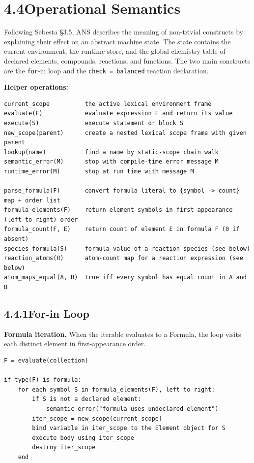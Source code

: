 \documentclass[11pt,a4paper]{article}
\newcommand{\code}[1]{\texttt{#1}}
\begin{document}
\newpage
\section{4.4\quad Operational Semantics}

Following Sebesta \S3.5, ANS describes the meaning of non-trivial constructs by explaining their effect on an abstract machine state. The state contains the current environment, the runtime store, and the global chemistry table of declared elements, compounds, reactions, and functions. The two main constructs are the \code{for}-in loop and the \code{check = balanced} reaction declaration.

\textbf{Helper operations:}
\begin{lstlisting}[style=sem]
current_scope          the active lexical environment frame
evaluate(E)            evaluate expression E and return its value
execute(S)             execute statement or block S
new_scope(parent)      create a nested lexical scope frame with given parent
lookup(name)           find a name by static-scope chain walk
semantic_error(M)      stop with compile-time error message M
runtime_error(M)       stop at run time with message M

parse_formula(F)       convert formula literal to {symbol -> count} map + order list
formula_elements(F)    return element symbols in first-appearance (left-to-right) order
formula_count(F, E)    return count of element E in formula F (0 if absent)
species_formula(S)     formula value of a reaction species (see below)
reaction_atoms(R)      atom-count map for a reaction expression (see below)
atom_maps_equal(A, B)  true iff every symbol has equal count in A and B
\end{lstlisting}

\subsection{4.4.1\quad For-in Loop}

\textbf{Formula iteration.}\; When the iterable evaluates to a Formula, the loop visits each distinct element in first-appearance order.

\begin{lstlisting}[style=sem]
F = evaluate(collection)

if type(F) is formula:
    for each symbol S in formula_elements(F), left to right:
        if S is not a declared element:
            semantic_error("formula uses undeclared element")
        iter_scope = new_scope(current_scope)
        bind variable in iter_scope to the Element object for S
        execute body using iter_scope
        destroy iter_scope
    end
\end{lstlisting}
\end{document}
